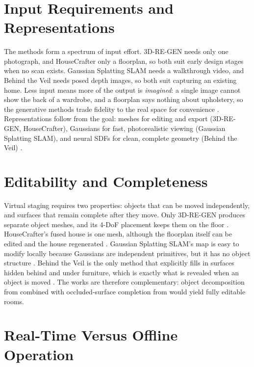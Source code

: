 \documentclass[12pt,a4paper,final]{extreport}
\begin{document}
\section{Input Requirements and Representations}

\paragraph{} The methods form a spectrum of input effort. 3D-RE-GEN needs only one photograph, and HouseCrafter only a floorplan, so both suit early design stages when no scan exists. Gaussian Splatting SLAM needs a walkthrough video, and Behind the Veil needs posed depth images, so both suit capturing an existing home. Less input means more of the output is \emph{imagined}: a single image cannot show the back of a wardrobe, and a floorplan says nothing about upholstery, so the generative methods trade fidelity to the real space for convenience \cite{p1,p2}. Representations follow from the goal: meshes for editing and export (3D-RE-GEN, HouseCrafter), Gaussians for fast, photorealistic viewing (Gaussian Splatting SLAM), and neural SDFs for clean, complete geometry (Behind the Veil) \cite{p3,p4}.

\section{Editability and Completeness}

\paragraph{} Virtual staging requires two properties: objects that can be moved independently, and surfaces that remain complete after they move. Only 3D-RE-GEN produces separate object meshes, and its 4-DoF placement keeps them on the floor \cite{p1}. HouseCrafter's fused house is one mesh, although the floorplan itself can be edited and the house regenerated \cite{p2}. Gaussian Splatting SLAM's map is easy to modify locally because Gaussians are independent primitives, but it has no object structure \cite{p3}. Behind the Veil is the only method that explicitly fills in surfaces hidden behind and under furniture, which is exactly what is revealed when an object is moved \cite{p4}. The works are therefore complementary: object decomposition from \cite{p1} combined with occluded-surface completion from \cite{p4} would yield fully editable rooms.

\section{Real-Time Versus Offline Operation}
\end{document}
